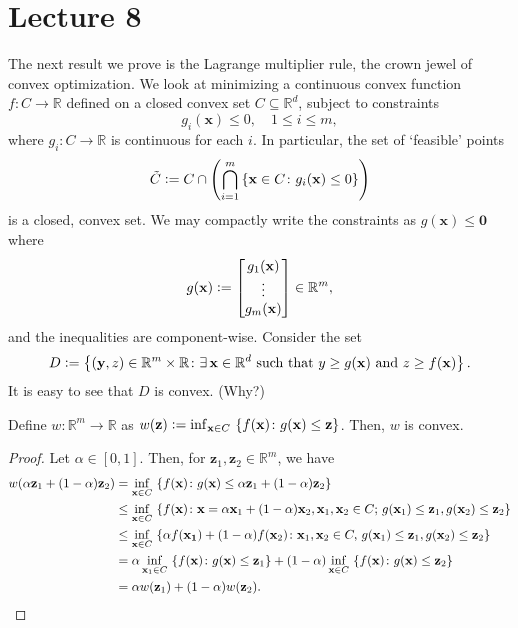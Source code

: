 \section{Lecture 8}

The next result we prove is the Lagrange multiplier rule, the crown jewel of convex optimization. We look at minimizing a continuous convex function $f \colon C \to \mathbb{R}$ defined on a closed convex set $C \subseteq \mathbb{R}^d$, subject to constraints
\[
    g_i(\mathbf{x}) \leq 0 , \quad 1 \leq i \leq m,
\]
where $g_i \colon C \to \mathbb{R}$ is continuous for each $i$. In particular, the set of `feasible' points
\[
    \Tilde{C} \vcentcolon= C \cap \left( \bigcap_{i=1}^m \left\{ \mathbf{x} \in C \colon g_i(\mathbf{x}) \leq 0 \right\} \right)
\]
is a closed, convex set. We may compactly write the constraints as $g(\mathbf{x}) \leq \mathbf{0}$ where
\[
    g(\mathbf{x}) \vcentcolon= \begin{bmatrix}
        g_1(\mathbf{x}) \\ \vdots \\ g_m(\mathbf{x})
    \end{bmatrix} \in \mathbb{R}^m,
\]
and the inequalities are component-wise. Consider the set
\[
    D \vcentcolon= \left\{ (\mathbf{y}, z) \in \mathbb{R}^m \times \mathbb{R} \colon \exists \, \mathbf{x} \in \mathbb{R}^d \text{ such that } y \geq g(\mathbf{x}) \text{ and } z \geq f(\mathbf{x}) \right\}.
\]
It is easy to see that $D$ is convex. (Why?) 

\begin{lem}
    Define $w \colon \mathbb{R}^m \to \mathbb{R}$ as $w(\mathbf{z}) \vcentcolon= \inf_{\mathbf{x} \in C} \, \left\{ f(\mathbf{x}) \colon g(\mathbf{x}) \leq \mathbf{z} \right\}$. Then, $w$ is convex. 
\end{lem}
\begin{proof}
    Let $\alpha \in [0,1]$. Then, for $\mathbf{z}_1, \mathbf{z}_2 \in \mathbb{R}^m$, we have
    \begin{align*}
        w(\alpha\mathbf{z}_1 + (1-\alpha)\mathbf{z}_2) &= \inf_{\mathbf{x} \in C} \, \left\{ f(\mathbf{x}) \colon g(\mathbf{x}) \leq \alpha\mathbf{z}_1 + (1-\alpha)\mathbf{z}_2 \right\} \\
        &\leq \inf_{\mathbf{x} \in C} \, \left\{ f(\mathbf{x}) \colon \mathbf{x} = \alpha\mathbf{x}_1 + (1-\alpha)\mathbf{x}_2, \mathbf{x}_1, \mathbf{x}_2 \in C; \, g(\mathbf{x}_1) \leq\mathbf{z}_1 , g(\mathbf{x}_2) \leq \mathbf{z}_2 \right\}  \\
        &\leq \inf_{\mathbf{x} \in C} \, \left\{ \alpha f(\mathbf{x_1}) + (1-\alpha) f(\mathbf{x}_2) \colon \mathbf{x}_1, \mathbf{x}_2 \in C, \, g(\mathbf{x}_1) \leq\mathbf{z}_1 , g(\mathbf{x}_2) \leq \mathbf{z}_2 \right\} \\
        &= \alpha \inf_{\mathbf{x}_1 \in C} \, \left\{ f(\mathbf{x}) \colon g(\mathbf{x}) \leq \mathbf{z}_1 \right\} + (1-\alpha) \inf_{\mathbf{x} \in C} \, \left\{ f(\mathbf{x}) \colon g(\mathbf{x}) \leq \mathbf{z}_2 \right\} \\
        &= \alpha w(\mathbf{z}_1) + (1-\alpha) w(\mathbf{z}_2). \qedhere
    \end{align*}
\end{proof}

